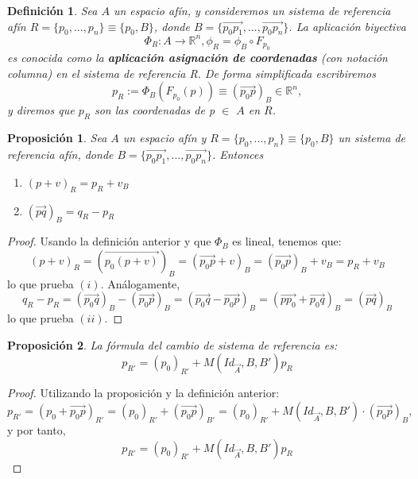 \documentclass[a4paper,11pt, oneside]{book}
\newtheorem{defi}{Definición}
\newtheorem{prop}{Proposición}
\begin{document}
\begin{defi}
	Sea $A$ un espacio afín, y consideremos un sistema de referencia afín $R = \{p_0,...,p_n\} \equiv \{p_0, B\}$, donde
	$B = \{\overrightarrow{p_0p_1},...,\overrightarrow{p_0p_n}\}$. La aplicación biyectiva
	\begin{equation}
	\Phi_R : A \rightarrow \mathbb R^n, \phi_R = \phi_B \circ F_{p_0}
	\end{equation}
	es conocida como la \textbf{aplicación asignación de coordenadas} (con notación columna) en el sistema de referencia R. De forma simplificada escribiremos
	\begin{equation}
	p_R := \Phi_B(F_{p_0}(p)) \equiv (\overrightarrow{p_0p})_B \in \mathbb R^n, 
	\end{equation}
	y diremos que $p_R$ son las coordenadas de p $\in$ $A$ en $R$.
\end{defi}
\begin{prop}
	Sea $A$ un espacio afín y $R = \{p_0,...,p_n\} \equiv \{p_0,B\}$ un sistema de referencia afín, donde $B = \{\overrightarrow{p_0p_1},...,\overrightarrow{p_0p_n}\}$. Entonces
	\begin{enumerate}
		\item $(p+v)_R = p_R + v_B$
		\item $(\overrightarrow{pq})_B = q_R - p_R$
	\end{enumerate}
\end{prop}
\begin{proof}
	Usando la definición anterior y que $\Phi_B$ es lineal, tenemos que:
	\begin{equation}
	(p+v)_R = (\overrightarrow{p_0(p+v)})_B = (\overrightarrow{p_0p}+v)_B = (\overrightarrow{p_0p})_B +v_B = p_R +v_B
	\end{equation}
	lo que prueba $(i)$. Análogamente,
	\begin{equation}
	q_R - p_R = (\overrightarrow{p_0q})_B - (\overrightarrow{p_0p})_B = (\overrightarrow{p_0q} - \overrightarrow{p_0p})_B = (\overrightarrow{pp_0}+\overrightarrow{p_0q})_B = (\overrightarrow{pq})_B
	\end{equation}
	lo que prueba $(ii)$.
\end{proof}
\begin{prop}
		La fórmula del cambio de sistema de referencia es:
	\begin{equation}
		p_{R'} = (p_0)_{R'} + M(Id_{\overrightarrow{A}}, B, B')p_R
	\end{equation}
\end{prop}
\begin{proof}
	Utilizando la proposición y la definición anterior:
	\begin{equation}
	p_{R'} = (p_0 + \overrightarrow{p_0p})_{R'} = (p_0)_{R'} + (\overrightarrow{p_{0}p})_{B'} = (p_0)_{R'} + M(Id_{\overrightarrow{A}}, B, B') \cdot  (\overrightarrow{p_0p})_B,
	\end{equation}
	y por tanto,
	\begin{equation}
	p_{R'} = (p_0)_{R'} + M(Id_{\overrightarrow{A}}, B, B')p_R
	\end{equation}
\end{proof}
\end{document}
